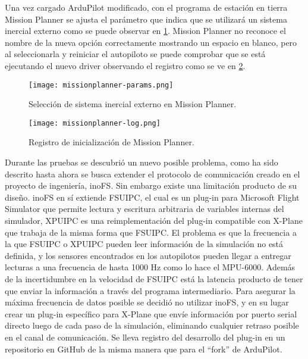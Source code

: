 Una vez cargado ArduPilot modificado, con el programa de estación en tierra Mission Planner se ajusta el parámetro que indica que se utilizará un sistema inercial externo como se puede observar en \cref{fig:missionplanner-params}. Mission Planner no reconoce el nombre de la nueva opción correctamente mostrando un espacio en blanco, pero al seleccionarla y reiniciar el autopiloto se puede comprobar que se está ejecutando el nuevo driver observando el registro como se ve en \cref{fig:missionplanner-log}.

\begin{figure}[h]
    \centering
    \texttt{[image: missionplanner-params.png]}
    \caption{Selección de sistema inercial externo en Mission Planner.}
    \label{fig:missionplanner-params}
\end{figure}

\begin{figure}[h]
    \centering
    \texttt{[image: missionplanner-log.png]}
    \caption{Registro de inicialización de Mission Planner.}
    \label{fig:missionplanner-log}
\end{figure}

Durante las pruebas se descubrió un nuevo posible problema, como ha sido descrito hasta ahora se busca extender el protocolo de comunicación creado en el proyecto de ingeniería, inoFS. Sin embargo existe una limitación producto de su diseño. inoFS en sí extiende FSUIPC, el cual es un plug-in para Microsoft Flight Simulator que permite lectura y escritura arbitraria de variables internas del simulador, XPUIPC es una reimplementación del plug-in compatible con X-Plane que trabaja de la misma forma que FSUIPC. El problema es que la frecuencia a la que FSUIPC o XPUIPC pueden leer información de la simulación no está definida, y los sensores encontrados en los autopilotos pueden llegar a entregar lecturas a una frecuencia de hasta 1000 Hz como lo hace el MPU-6000. Además de la incertidumbre en la velocidad de FSUIPC está la latencia producto de tener que enviar la información a través del programa intermediario. Para asegurar la máxima frecuencia de datos posible se decidió no utilizar inoFS, y en su lugar crear un plug-in específico para X-Plane que envíe información por puerto serial directo luego de cada paso de la simulación, eliminando cualquier retraso posible en el canal de comunicación. Se lleva registro del desarrollo del plug-in en un repositorio en GitHub \cite{xplane-hitl-plugin} de la misma manera que para el ``fork'' de ArduPilot.

